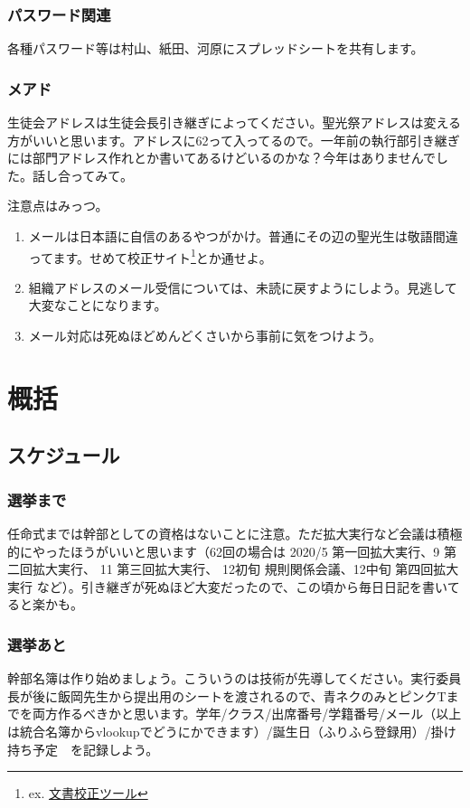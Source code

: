 \documentclass[a4paper]{ltjsreport}
\newcommand{\Chapter}[1]{\chapter{#1}\thispagestyle{fancy}}
\begin{document}
\subsection{パスワード関連}
各種パスワード等は村山、紙田、河原にスプレッドシートを共有します。

\subsection{メアド}
生徒会アドレスは生徒会長引き継ぎによってください。聖光祭アドレスは変える方がいいと思います。アドレスに62って入ってるので。一年前の執行部引き継ぎには部門アドレス作れとか書いてあるけどいるのかな？今年はありませんでした。話し合ってみて。

注意点はみっつ。
\begin{enumerate}
  \item メールは日本語に自信のあるやつがかけ。普通にその辺の聖光生は敬語間違ってます。せめて校正サイト\footnote{ex. \href{https://so-zou.jp/web-app/text/proofreading/}{文書校正ツール}}とか通せよ。
  \item 組織アドレスのメール受信については、未読に戻すようにしよう。見逃して大変なことになります。
  \item メール対応は死ぬほどめんどくさいから事前に気をつけよう。
\end{enumerate}

\Chapter{概括}
\section{スケジュール}
\subsection{選挙まで}
任命式までは幹部としての資格はないことに注意。ただ拡大実行など会議は積極的にやったほうがいいと思います（62回の場合は 2020/5 第一回拡大実行、9 第二回拡大実行、 11 第三回拡大実行、 12初旬 規則関係会議、12中旬 第四回拡大実行 など）。引き継ぎが死ぬほど大変だったので、この頃から毎日日記を書いてると楽かも。

\subsection{選挙あと}
幹部名簿は作り始めましょう。こういうのは技術が先導してください。実行委員長が後に飯岡先生から提出用のシートを渡されるので、青ネクのみとピンクTまでを両方作るべきかと思います。学年/クラス/出席番号/学籍番号/メール（以上は統合名簿からvlookupでどうにかできます）/誕生日（ふりふら登録用）/掛け持ち予定　を記録しよう。
\end{document}
